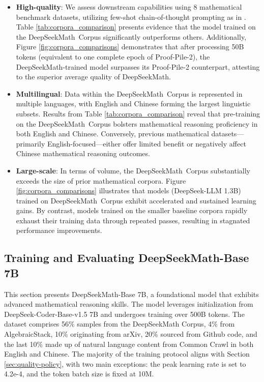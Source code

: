 \begin{itemize}[topsep=0pt]
    \item \textbf{High-quality}:
    We assess downstream capabilities using 8 mathematical benchmark datasets, utilizing few-shot chain-of-thought prompting as in \cite{cot}. Table \ref{tab:corpora_comparison} presents evidence that the model trained on the DeepSeekMath~Corpus significantly outperforms others. Additionally, Figure \ref{fig:corpora_comparisons} demonstrates that after processing 50B tokens (equivalent to one complete epoch of Proof-Pile-2), the DeepSeekMath-trained model surpasses its Proof-Pile-2 counterpart, attesting to the superior average quality of DeepSeekMath.
    \item \textbf{Multilingual}:
    Data within the DeepSeekMath~Corpus is represented in multiple languages, with English and Chinese forming the largest linguistic subsets. Results from Table \ref{tab:corpora_comparison} reveal that pre-training on the DeepSeekMath~Corpus bolsters mathematical reasoning proficiency in both English and Chinese. Conversely, previous mathematical datasets—primarily English-focused—either offer limited benefit or negatively affect Chinese mathematical reasoning outcomes.
    \item \textbf{Large-scale}:
    In terms of volume, the DeepSeekMath~Corpus substantially exceeds the size of prior mathematical corpora. Figure \ref{fig:corpora_comparisons} illustrates that models (DeepSeek-LLM 1.3B) trained on DeepSeekMath~Corpus exhibit accelerated and sustained learning gains. By contrast, models trained on the smaller baseline corpora rapidly exhaust their training data through repeated passes, resulting in stagnated performance improvements.
\end{itemize}

\subsection{Training and Evaluating DeepSeekMath-Base 7B}

This section presents DeepSeekMath-Base 7B, a foundational model that exhibits advanced mathematical reasoning skills. The model leverages initialization from DeepSeek-Coder-Base-v1.5 7B \citep{deepseek-coder} and undergoes training over 500B tokens. The dataset comprises 56\% samples from the DeepSeekMath Corpus, 4\% from AlgebraicStack, 10\% originating from arXiv, 20\% sourced from Github code, and the last 10\% made up of natural language content from Common Crawl in both English and Chinese. The majority of the training protocol aligns with Section \ref{sec:quality-policy}, with two main exceptions: the peak learning rate is set to 4.2e-4, and the token batch size is fixed at 10M.


